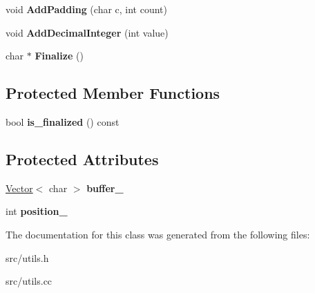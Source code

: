 \begin{DoxyCompactItemize}
\item 
\hypertarget{classv8_1_1internal_1_1_simple_string_builder_a550e57aa8ec2df7143c5e864b6ae5402}{}void {\bfseries Add\+Padding} (char c, int count)\label{classv8_1_1internal_1_1_simple_string_builder_a550e57aa8ec2df7143c5e864b6ae5402}

\item 
\hypertarget{classv8_1_1internal_1_1_simple_string_builder_a169f40e57341232ced1e8ac1e23fdbad}{}void {\bfseries Add\+Decimal\+Integer} (int value)\label{classv8_1_1internal_1_1_simple_string_builder_a169f40e57341232ced1e8ac1e23fdbad}

\item 
\hypertarget{classv8_1_1internal_1_1_simple_string_builder_ab6aebcff188bdab258d9c139e29543e4}{}char $\ast$ {\bfseries Finalize} ()\label{classv8_1_1internal_1_1_simple_string_builder_ab6aebcff188bdab258d9c139e29543e4}

\end{DoxyCompactItemize}
\subsection*{Protected Member Functions}
\begin{DoxyCompactItemize}
\item 
\hypertarget{classv8_1_1internal_1_1_simple_string_builder_a665668d78de473dbec74ba513b377ecb}{}bool {\bfseries is\+\_\+finalized} () const \label{classv8_1_1internal_1_1_simple_string_builder_a665668d78de473dbec74ba513b377ecb}

\end{DoxyCompactItemize}
\subsection*{Protected Attributes}
\begin{DoxyCompactItemize}
\item 
\hypertarget{classv8_1_1internal_1_1_simple_string_builder_a2e7d92b54792ab26c3bff5f96de202fc}{}\hyperlink{classv8_1_1internal_1_1_vector}{Vector}$<$ char $>$ {\bfseries buffer\+\_\+}\label{classv8_1_1internal_1_1_simple_string_builder_a2e7d92b54792ab26c3bff5f96de202fc}

\item 
\hypertarget{classv8_1_1internal_1_1_simple_string_builder_a0deafc31ecda5d1800219fc4232565c5}{}int {\bfseries position\+\_\+}\label{classv8_1_1internal_1_1_simple_string_builder_a0deafc31ecda5d1800219fc4232565c5}

\end{DoxyCompactItemize}


The documentation for this class was generated from the following files\+:\begin{DoxyCompactItemize}
\item 
src/utils.\+h\item 
src/utils.\+cc\end{DoxyCompactItemize}

